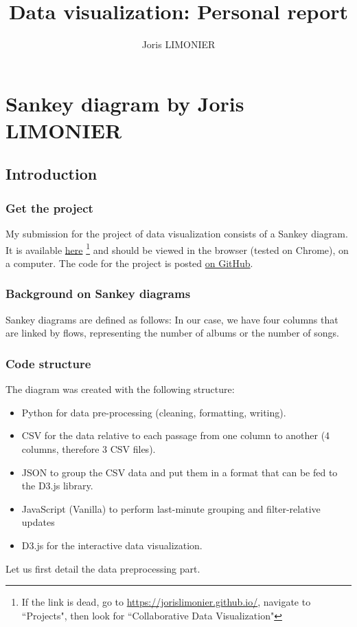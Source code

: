 \documentclass[a4paper, 11pt, oneside]{article}
\title{Data visualization: Personal report}
\author{Joris LIMONIER}
\begin{document}
\maketitle

\tableofcontents
\newpage

\section{Sankey diagram by Joris LIMONIER}

\subsection{Introduction}
\subsubsection{Get the project}
My submission for the project of data visualization consists of a Sankey diagram. It is available \href{https://jorislimonier.github.io/projects/collab-data-vis/index.html}{here} \footnote{If the link is dead, go to \href{https://jorislimonier.github.io/}{https://jorislimonier.github.io/}, navigate to ``Projects", then look for ``Collaborative Data Visualization"} and should be viewed in the browser (tested on Chrome), on a computer. The code for the project is posted \href{https://github.com/jorislimonier/collab-viz/tree/main/joris}{on GitHub}.

\subsubsection{Background on Sankey diagrams}
Sankey diagrams are defined as follows:  \cite{noauthor_sankey_2021} In our case, we have four columns that are linked by flows, representing the number of albums or the number of songs.

\subsubsection{Code structure}
The diagram was created with the following structure:

\begin{itemize}
    \item Python \cite{van2000python} for data pre-processing (cleaning, formatting, writing).
    \item CSV for the data relative to each passage from one column to another (4 columns, therefore 3 CSV files).
    \item JSON to group the CSV data and put them in a format that can be fed to the D3.js library.
    \item JavaScript (Vanilla) to perform last-minute grouping and filter-relative updates
    \item D3.js \cite{bostock_d_2011} for the interactive data visualization.
\end{itemize}
Let us first detail the data preprocessing part.
\end{document}
